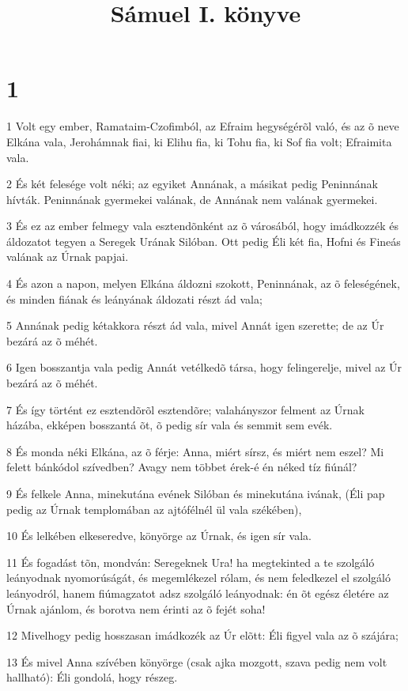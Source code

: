 

\title{Sámuel I. könyve}


\chapter{1}

\par 1 Volt egy ember, Ramataim-Czofimból, az Efraim hegységérõl való, és az õ neve Elkána vala, Jerohámnak fiai, ki Elihu fia, ki Tohu fia, ki Sof fia volt; Efraimita vala.
\par 2 És két felesége volt néki; az egyiket Annának, a másikat pedig Peninnának hívták. Peninnának gyermekei valának, de Annának nem valának gyermekei.
\par 3 És ez az ember felmegy vala esztendõnként az õ városából, hogy imádkozzék és áldozatot tegyen a Seregek Urának Silóban. Ott pedig Éli két fia, Hofni és Fineás valának az Úrnak papjai.
\par 4 És azon a napon, melyen Elkána áldozni szokott, Peninnának, az õ feleségének, és minden fiának és leányának áldozati részt ád vala;
\par 5 Annának pedig kétakkora részt ád vala, mivel Annát igen szerette; de az Úr bezárá az õ méhét.
\par 6 Igen bosszantja vala pedig Annát vetélkedõ társa, hogy felingerelje, mivel az Úr bezárá az õ méhét.
\par 7 És így történt ez esztendõrõl esztendõre; valahányszor felment az Úrnak házába, ekképen bosszantá õt, õ pedig sír vala és semmit sem evék.
\par 8 És monda néki Elkána, az õ férje: Anna, miért sírsz, és miért nem eszel? Mi felett bánkódol szívedben? Avagy nem többet érek-é én néked tíz fiúnál?
\par 9 És felkele Anna, minekutána evének Silóban és minekutána ivának, (Éli pap pedig az Úrnak templomában az ajtófélnél ül vala székében),
\par 10 És lelkében elkeseredve, könyörge az Úrnak, és igen sír vala.
\par 11 És fogadást tõn, mondván: Seregeknek Ura! ha megtekinted a te szolgáló leányodnak nyomorúságát, és megemlékezel rólam, és nem feledkezel el szolgáló leányodról, hanem fiúmagzatot adsz szolgáló leányodnak: én õt egész életére az Úrnak ajánlom, és borotva nem érinti az õ fejét soha!
\par 12 Mivelhogy pedig hosszasan imádkozék az Úr elõtt: Éli figyel vala az õ szájára;
\par 13 És mivel Anna szívében könyörge (csak ajka mozgott, szava pedig nem volt hallható): Éli gondolá, hogy részeg.
